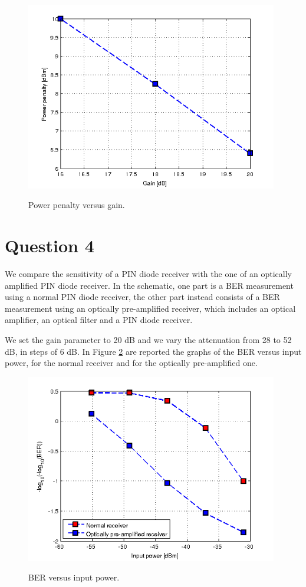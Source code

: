 \documentclass[a4paper,10pt]{report}
\begin{document}
\begin{figure}[!ht]
   \centering
   \includegraphics[width=11cm]{ex7_penaltycomparison2.png}\\
   \caption{Power penalty versus gain.}
   \label{ex7_penaltycomparison2}
\end{figure}


\newpage
\section*{Question 4}
We compare the sensitivity of a PIN diode receiver with the one of an optically amplified PIN diode receiver.
In the schematic, one part is a BER measurement using a normal PIN diode receiver, the other part instead consists of a BER measurement
using an optically pre-amplified receiver, which includes an optical amplifier, an optical filter and a PIN diode receiver.

We set the gain parameter to 20 dB and we vary the attenuation from 28 to 52 dB, in steps of 6 dB.
In Figure \ref{q4} are reported the graphs of the BER versus input power, for the normal receiver and for the optically pre-amplified one.

\begin{figure}[!ht]
   \centering
   \includegraphics[width=11cm]{q4.png}\\
   \caption{BER versus input power.}
   \label{q4}
\end{figure}
\end{document}
